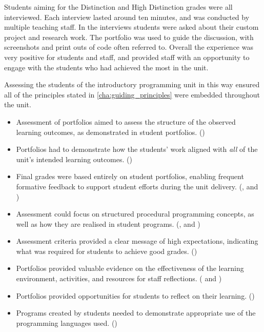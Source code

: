 Students aiming for the Distinction and High Distinction grades were all interviewed. Each interview lasted around ten minutes, and was conducted by multiple teaching staff. In the interviews students were asked about their custom project and research work. The portfolio was used to guide the discussion, with screenshots and print outs of code often referred to. Overall the experience was very positive for students and staff, and provided staff with an opportunity to engage with the students who had achieved the most in the unit.

Assessing the students of the introductory programming unit in this way ensured all of the principles stated in \cref{cha:guiding_principles} were embedded throughout the unit.

\begin{itemize}[noitemsep,nolistsep]
	\item Assessment of portfolios aimed to assess the structure of the observed learning outcomes, as demonstrated in student portfolios. ()
	\item Portfolios had to demonstrate how the students' work aligned with \emph{all} of the unit's intended learning outcomes. ()
	\item Final grades were based entirely on student portfolios, enabling frequent formative feedback to support student efforts during the unit delivery. (,  and )
	\item Assessment could focus on structured procedural programming concepts, as well as how they are realised in student programs. (,  and )
	\item Assessment criteria provided a clear message of high expectations, indicating what was required for students to achieve good grades. ()
	\item Portfolios provided valuable evidence on the effectiveness of the learning environment, activities, and resources for staff reflections.  ( and )
	\item Portfolios provided opportunities for students to reflect on their learning. ()
	\item Programs created by students needed to demonstrate appropriate use of the programming languages used.  ()
\end{itemize}

